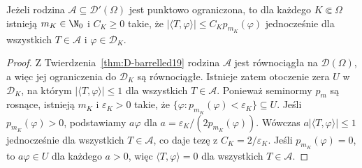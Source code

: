 \begin{wniosek}
\label{cor:uniform-order19}
Jeżeli rodzina $\mathcal A\subseteq\mathcal D'(\Omega)$ jest
punktowo ograniczona, to dla każdego $K\Subset\Omega$
istnieją $m_K\in\N_0$ i $C_K\ge0$ takie, że
$|\langle T,\varphi\rangle|\le C_Kp_{m_K}(\varphi)$
jednocześnie dla wszystkich $T\in\mathcal A$
i $\varphi\in\mathcal D_K$.
\end{wniosek}
\begin{proof}
Z Twierdzenia~\ref{thm:D-barrelled19} rodzina $\mathcal A$
jest równociągła na $\mathcal D(\Omega)$, a więc jej
ograniczenia do $\mathcal D_K$ są równociągłe.
Istnieje zatem otoczenie zera $U$ w $\mathcal D_K$,
na którym $|\langle T,\varphi\rangle|\le1$ dla wszystkich
$T\in\mathcal A$. Ponieważ seminormy $p_m$ są rosnące,
istnieją $m_K$ i $\varepsilon_K>0$ takie, że
$\{\varphi:p_{m_K}(\varphi)<\varepsilon_K\}\subseteq U$.
Jeśli $p_{m_K}(\varphi)>0$, podstawiamy
$a\varphi$ dla $a=\varepsilon_K/(2p_{m_K}(\varphi))$.
Wówczas $a|\langle T,\varphi\rangle|\le1$
jednocześnie dla wszystkich $T\in\mathcal A$,
co daje tezę z $C_K=2/\varepsilon_K$.
Jeśli $p_{m_K}(\varphi)=0$, to $a\varphi\in U$
dla każdego $a>0$, więc $\langle T,\varphi\rangle=0$
dla wszystkich $T\in\mathcal A$.
\end{proof}

